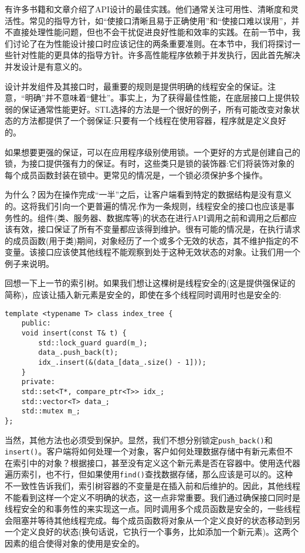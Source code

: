 
有许多书籍和文章介绍了API设计的最佳实践。他们通常关注可用性、清晰度和灵活性。常见的指导方针，如“使接口清晰且易于正确使用”和“使接口难以误用”，并不直接处理性能问题，但也不会干扰促进良好性能和效率的实践。在前一节中，我们讨论了在为性能设计接口时应该记住的两条重要准则。在本节中，我们将探讨一些针对性能的更具体的指导方针。许多高性能程序依赖于并发执行，因此首先解决并发设计是有意义的。


设计并发组件及其接口时，最重要的规则是提供明确的线程安全的保证。注意，“明确”并不意味着“健壮”。事实上，为了获得最佳性能，在底层接口上提供较弱的保证通常性能更好。STL选择的方法是一个很好的例子，所有可能改变对象状态的方法都提供了一个弱保证:只要有一个线程在使用容器，程序就是定义良好的。 

如果想要更强的保证，可以在应用程序级别使用锁。一个更好的方式是创建自己的锁，为接口提供强有力的保证。有时，这些类只是锁的装饰器:它们将装饰对象的每个成员函数封装在锁中。更常见的情况是，一个锁必须保护多个操作。

为什么？因为在操作完成“一半”之后，让客户端看到特定的数据结构是没有意义的。这将我们引向一个更普遍的情况:作为一条规则，线程安全的接口也应该是事务性的。组件(类、服务器、数据库等)的状态在进行API调用之前和调用之后都应该有效，接口保证了所有不变量都应该得到维护。很有可能的情况是，在执行请求的成员函数(用于类)期间，对象经历了一个或多个无效的状态，其不维护指定的不变量。该接口应该使其他线程不能观察到处于这种无效状态的对象。让我们用一个例子来说明。

回想一下上一节的索引树。如果我们想让这棵树是线程安全的(这是提供强保证的简称)，应该让插入新元素是安全的，即使在多个线程同时调用时也是安全的:

\begin{lstlisting}[style=styleCXX]
template <typename T> class index_tree {
	public:
	void insert(const T& t) {
		std::lock_guard guard(m_);
		data_.push_back(t);
		idx_.insert(&(data_[data_.size() - 1]));
	}
	private:
	std::set<T*, compare_ptr<T>> idx_;
	std::vector<T> data_;
	std::mutex m_;
};

\end{lstlisting}

当然，其他方法也必须受到保护。显然，我们不想分别锁定\texttt{push\_back()}和\texttt{insert()}。客户端将如何处理一个对象，客户如何处理数据存储中有新元素但不在索引中的对象？根据接口，甚至没有定义这个新元素是否在容器中。使用迭代器遍历索引，也不行，但如果使用\texttt{find()}查找数据存储，那么应该是可以的。这种不一致性告诉我们，索引树容器的不变量是在插入前和后维护的。因此，其他线程不能看到这样一个定义不明确的状态，这一点非常重要。我们通过确保接口同时是线程安全的和事务性的来实现这一点。同时调用多个成员函数是安全的，一些线程会阻塞并等待其他线程完成。每个成员函数将对象从一个定义良好的状态移动到另一个定义良好的状态(换句话说，它执行一个事务，比如添加一个新元素)。这两个因素的组合使得对象的使用是安全的。

